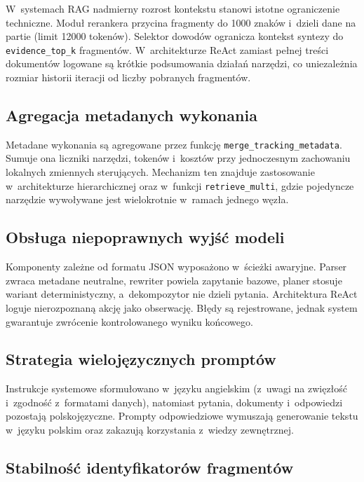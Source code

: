 W~systemach RAG nadmierny rozrost kontekstu stanowi istotne ograniczenie
techniczne. Moduł rerankera przycina fragmenty do 1000 znaków i~dzieli dane na
partie (limit 12000 tokenów). Selektor dowodów ogranicza kontekst syntezy do
\texttt{evidence\_top\_k} fragmentów. W~architekturze ReAct zamiast pełnej
treści dokumentów logowane są krótkie podsumowania działań narzędzi, co
uniezależnia rozmiar historii iteracji od liczby pobranych fragmentów.

\subsection{Agregacja metadanych wykonania}\label{subsec:spojnosc-metadanych-wykonania}

Metadane wykonania są agregowane przez funkcję
\texttt{merge\_tracking\_metadata}. Sumuje ona liczniki narzędzi, tokenów
i~kosztów przy jednoczesnym zachowaniu lokalnych zmiennych sterujących.
Mechanizm ten znajduje zastosowanie w~architekturze hierarchicznej oraz
w~funkcji \texttt{retrieve\_multi}, gdzie pojedyncze narzędzie wywoływane jest
wielokrotnie w~ramach jednego węzła.

\subsection{Obsługa niepoprawnych wyjść modeli}\label{subsec:odpornosc-na-niepoprawne-wyjscia-modeli}

Komponenty zależne od formatu JSON wyposażono w~ścieżki awaryjne. Parser zwraca
metadane neutralne, rewriter powiela zapytanie bazowe, planer stosuje wariant
deterministyczny, a~dekompozytor nie dzieli pytania. Architektura ReAct loguje
nierozpoznaną akcję jako obserwację. Błędy są rejestrowane, jednak system
gwarantuje zwrócenie kontrolowanego wyniku końcowego.

\subsection{Strategia wielojęzycznych promptów}\label{subsec:dwujezyczny-charakter-promptow}

Instrukcje systemowe sformułowano w~języku angielskim (z~uwagi na zwięzłość
i~zgodność z~formatami danych), natomiast pytania, dokumenty i~odpowiedzi
pozostają polskojęzyczne. Prompty odpowiedziowe wymuszają generowanie tekstu
w~języku polskim oraz zakazują korzystania z~wiedzy zewnętrznej.

\subsection{Stabilność identyfikatorów fragmentów}\label{subsec:idempotencja-indeksowania}

